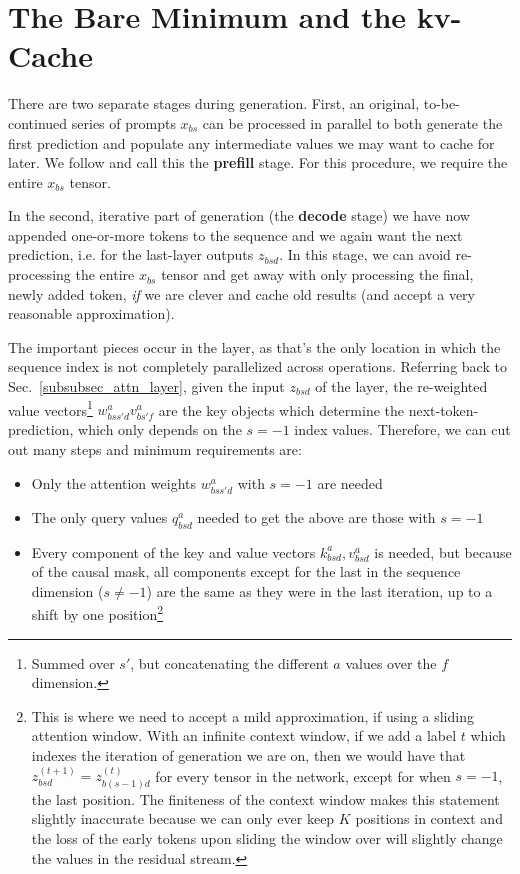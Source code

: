 \documentclass[11pt]{article}
\begin{document}
\section{The Bare Minimum and the kv-Cache \label{sec_kv_cache}}


There are two separate stages during generation. First, an original, to-be-continued series of prompts
$ x _{ bs }  $ can be processed in parallel to both generate the first prediction and populate any
intermediate values we may want to cache for later. We follow \cite{pope2022efficiently} and call this the
\textbf{prefill} stage. For this procedure, we require the entire $ x _{ bs } $ tensor.

In the second, iterative part of generation (the \textbf{decode} stage) we have now appended
one-or-more tokens to the sequence and we again want the next prediction, i.e. 
for the last-layer outputs $ z _{ bsd } $. In this stage, we can avoid re-processing the entire $ x
		_{ bs } $ tensor and get away with only processing the final, newly added token, \textit{if} we are
clever and cache old results (and accept a very reasonable approximation).

The important pieces occur in the  layer, as that's the only location in
which the sequence index is not completely parallelized across operations. Referring back to
Sec.~\ref{subsubsec_attn_layer}, given the input $ z _{ bsd } $ of the 
layer, the re-weighted value vectors\footnote{Summed over $ s' $, but concatenating the different $
		a $ values over the $ f $ dimension.} $ w ^{ a }_{ bss'd } v ^{ a } _{ bs'f } $ are the key objects
which determine the next-token-prediction, which only depends on the $ s=-1 $ index values.
Therefore, we can cut out many steps and minimum requirements are:
\begin{itemize}
	\item Only the attention weights $ w ^{ a }_{ bss'd }$ with $ s=-1 $ are needed
	\item The only query values $ q ^{ a }_{ bsd } $ needed to get the above are those with $ s=-1 $
	\item Every component of the key and value vectors $k ^{ a }_{ bsd }, v ^{ a }_{ bsd } $ is
          needed, but because of the causal mask, all components except for the last in the sequence
          dimension ($ s\neq -1 $) are the same as they were in the last iteration, up to a shift by
          one position\footnote{This is where we need to accept a mild approximation, if using a
              sliding attention window. With an infinite context window, if we add a label $ t $
              which indexes the iteration of generation we are on, then we would have that $ z ^{
              (t+1) } _{ bsd } = z ^{ (t)} _{ b (s-1)d } $ for every tensor in the network, except
              for when $ s=-1 $, the last position. The finiteness of the context window makes this
              statement slightly inaccurate because we can only ever keep $ K $ positions in context
              and the loss of the early tokens upon sliding the window over will slightly change the
          values in the residual stream.}
\end{itemize}
\end{document}
